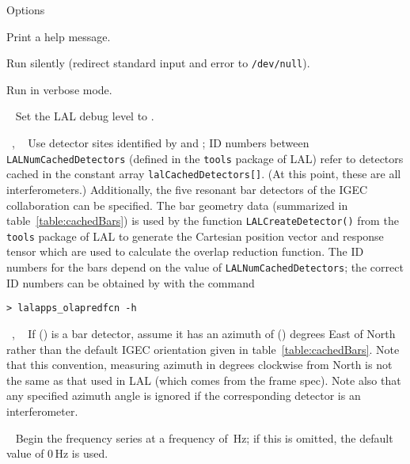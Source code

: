 \begin{entry}
\item[Options]\leavevmode
\begin{entry}
\item[\option{-h}]
Print a help message.

\item[\option{-q}]
Run silently (redirect standard input and error to \texttt{/dev/null}).

\item[\option{-v}]
Run in verbose mode.

\item[\option{-d}~\parm{debugLevel}]
Set the LAL debug level to .

\item[\option{-s}~\parm{siteID1}, \option{-t}~\parm{siteID2}]
Use detector sites identified by  and ; ID
numbers between \texttt{LALNumCachedDetectors} (defined in the
\texttt{tools} package of LAL) refer to detectors cached in the constant
array \texttt{lalCachedDetectors[]}.  (At this point, these are all
interferometers.)  Additionally, the five resonant bar detectors of the
IGEC collaboration can be specified. The bar geometry data (summarized
in table~\ref{table:cachedBars}) is used by the function
\texttt{LALCreateDetector()} from the \texttt{tools} package of LAL to
generate the Cartesian position vector and response tensor which are
used to calculate the overlap reduction function.  The ID numbers for
the bars depend on the value of \texttt{LALNumCachedDetectors}; the
correct ID numbers can be obtained by with the command
\begin{verbatim}
> lalapps_olapredfcn -h
\end{verbatim}

\item[\option{-a}~\parm{azimuth1}, \option{-b}~\parm{azimuth2}]
If  () is a bar detector, assume it has an
azimuth of  () degrees East of North
rather than the default IGEC orientation given in
table~\ref{table:cachedBars}.  Note that this convention, measuring
azimuth in degrees clockwise from North is not the same as that used in
LAL (which comes from the frame spec).  Note also that any specified
azimuth angle is ignored if the corresponding detector is an
interferometer.

\item[\option{-f}~\parm{fLow}]
Begin the frequency series at a frequency of \,Hz; if this
is omitted, the default value of 0\,Hz is used.


\end{entry}
\end{entry}
